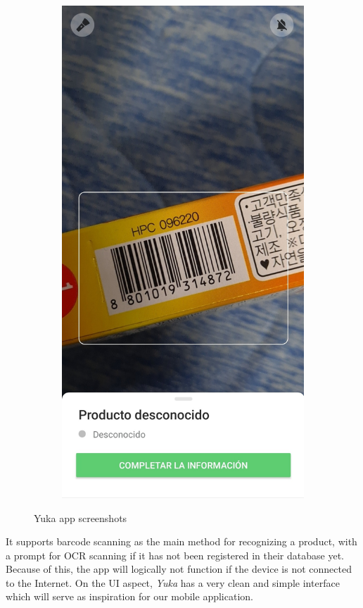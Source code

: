 \begin{figure}[h]
\begin{subfigure}{0.3\textwidth}
        \centering
        \includegraphics[width=0.9\linewidth]{Figures/Yuka-3.jpg}
        \caption{}
        \label{fig:yuka-3}
    \end{subfigure}
    \caption{Yuka app screenshots}
    \label{fig:yuka-screenshot}
\end{figure}

It supports barcode scanning as the main method for recognizing a product, with a prompt for OCR scanning if it has not been registered in their database yet. Because of this, the app will logically not function if the device is not connected to the Internet. On the UI aspect, \textit{Yuka} has a very clean and simple interface which will serve as inspiration for our mobile application.

